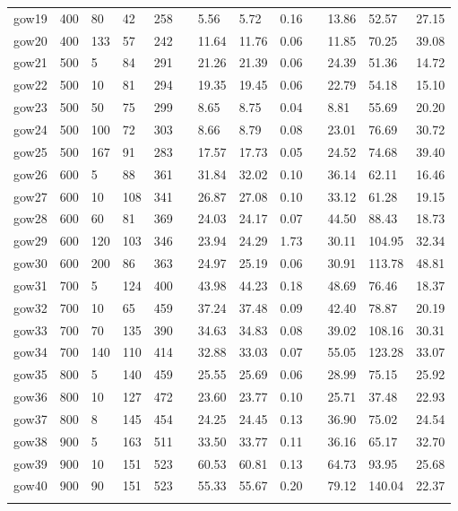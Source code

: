 \begin{table}[H]
\begin{tabularx}{\textwidth}{llllllXXXlXXX}
        gow19 & 400 & 80 & 42 & 258 && 5.56 & 5.72 & 0.16 && 13.86 & 52.57 & 27.15\\
        gow20 & 400 & 133 & 57 & 242 && 11.64 & 11.76 & 0.06 && 11.85 & 70.25 & 39.08\\
        gow21 & 500 & 5 & 84 & 291 && 21.26 & 21.39 & 0.06 && 24.39 & 51.36 & 14.72\\
        gow22 & 500 & 10 & 81 & 294 && 19.35 & 19.45 & 0.06 && 22.79 & 54.18 & 15.10\\
        gow23 & 500 & 50 & 75 & 299 && 8.65 & 8.75 & 0.04 && 8.81 & 55.69 & 20.20\\
        gow24 & 500 & 100 & 72 & 303 && 8.66 & 8.79 & 0.08 && 23.01 & 76.69 & 30.72\\
        gow25 & 500 & 167 & 91 & 283 && 17.57 & 17.73 & 0.05 && 24.52 & 74.68 & 39.40\\
        gow26 & 600 & 5 & 88 & 361 && 31.84 & 32.02 & 0.10 && 36.14 & 62.11 & 16.46\\
        gow27 & 600 & 10 & 108 & 341 && 26.87 & 27.08 & 0.10 && 33.12 & 61.28 & 19.15\\
        gow28 & 600 & 60 & 81 & 369 && 24.03 & 24.17 & 0.07 && 44.50 & 88.43 & 18.73\\
        gow29 & 600 & 120 & 103 & 346 && 23.94 & 24.29 & 1.73 && 30.11 & 104.95 & 32.34\\
        gow30 & 600 & 200 & 86 & 363 && 24.97 & 25.19 & 0.06 && 30.91 & 113.78 & 48.81\\
        gow31 & 700 & 5 & 124 & 400 && 43.98 & 44.23 & 0.18 && 48.69 & 76.46 & 18.37\\
        gow32 & 700 & 10 & 65 & 459 && 37.24 & 37.48 & 0.09 && 42.40 & 78.87 & 20.19\\
        gow33 & 700 & 70 & 135 & 390 && 34.63 & 34.83 & 0.08 && 39.02 & 108.16 & 30.31\\
        gow34 & 700 & 140 & 110 & 414 && 32.88 & 33.03 & 0.07 && 55.05 & 123.28 & 33.07\\
        gow35 & 800 & 5 & 140 & 459 && 25.55 & 25.69 & 0.06 && 28.99 & 75.15 & 25.92\\
        gow36 & 800 & 10 & 127 & 472 && 23.60 & 23.77 & 0.10 && 25.71 & 37.48 & 22.93\\
        gow37 & 800 & 8 & 145 & 454 && 24.25 & 24.45 & 0.13 && 36.90 & 75.02 & 24.54\\
        gow38 & 900 & 5 & 163 & 511 && 33.50 & 33.77 & 0.11 && 36.16 & 65.17 & 32.70\\
        gow39 & 900 & 10 & 151 & 523 && 60.53 & 60.81 & 0.13 && 64.73 & 93.95 & 25.68\\
        gow40 & 900 & 90 & 151 & 523 && 55.33 & 55.67 & 0.20 && 79.12 & 140.04 & 22.37\\
        \lasthline
    \end{tabularx}
    \normalsize
\end{table}
